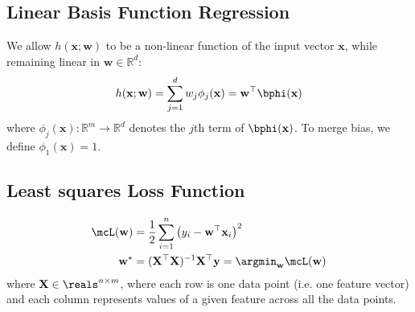 \documentclass[12pt,letterpaper]{article}
\newcommand{\1}{\mathbbm{1}}
\begin{document}
\subsection{Linear Basis Function Regression}
We allow $h(\mathbf{x};\mathbf{w})$ to be a non-linear function of the input vector $\mathbf{x}$, while remaining linear in $\mathbf{w} \in \mathbb{R}^d$:
\begin{align}
    h(\mathbf{x};\mathbf{w})= \sum_{j=1}^{d}w_j\phi_j(\mathbf{x})
    =\mathbf{w}^\top\mathbf{\bphi}(\mathbf{x})
\end{align}
where $\phi_j(\mathbf{x}) : \mathbb{R}^m \rightarrow \mathbb{R}^d$ denotes the $j$th term of $\bphi(\mathbf{x})$. To merge bias, we define $\phi_1(\mathbf{x})=1$.

\subsection{Least squares Loss Function}
\begin{align}
    \mcL(\mathbf{w}) &=\dfrac{1}{2}\sum_{i=1}^n\left(y_i-\mathbf{w}^\top\mathbf{x}_i\right)^2\\
    \mathbf{w}^* &= (\mathbf{X}^\top\mathbf{X})^{-1}\mathbf{X}^\top\mathbf{y} = \argmin_{\mathbf{w}} \mcL(\mathbf{w})
\end{align}
where $\mathbf{X} \in \reals^{n \times m}$, where each row is one data point (i.e. one feature vector) and each column represents values of a given feature across all the data points.\\

\end{document}
